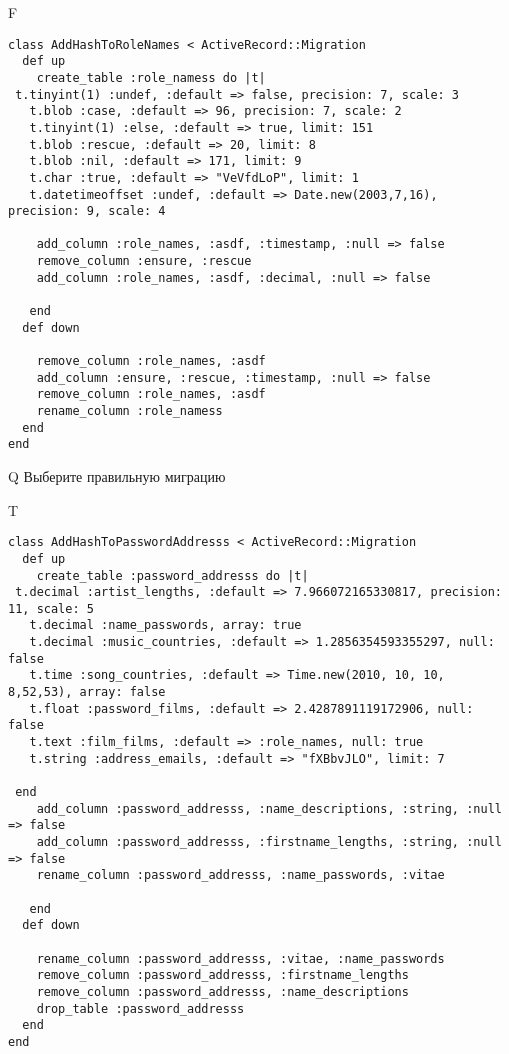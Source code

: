 F
\begin{verbatim}
class AddHashToRoleNames < ActiveRecord::Migration
  def up
    create_table :role_namess do |t| 
 t.tinyint(1) :undef, :default => false, precision: 7, scale: 3
   t.blob :case, :default => 96, precision: 7, scale: 2
   t.tinyint(1) :else, :default => true, limit: 151
   t.blob :rescue, :default => 20, limit: 8
   t.blob :nil, :default => 171, limit: 9
   t.char :true, :default => "VeVfdLoP", limit: 1
   t.datetimeoffset :undef, :default => Date.new(2003,7,16), precision: 9, scale: 4

    add_column :role_names, :asdf, :timestamp, :null => false
    remove_column :ensure, :rescue
    add_column :role_names, :asdf, :decimal, :null => false

   end
  def down

    remove_column :role_names, :asdf
    add_column :ensure, :rescue, :timestamp, :null => false
    remove_column :role_names, :asdf
    rename_column :role_namess
  end
end
\end{verbatim}
Q
Выберите правильную миграцию

T
\begin{verbatim}
class AddHashToPasswordAddresss < ActiveRecord::Migration
  def up
    create_table :password_addresss do |t|
 t.decimal :artist_lengths, :default => 7.966072165330817, precision: 11, scale: 5
   t.decimal :name_passwords, array: true
   t.decimal :music_countries, :default => 1.2856354593355297, null: false
   t.time :song_countries, :default => Time.new(2010, 10, 10, 8,52,53), array: false
   t.float :password_films, :default => 2.4287891119172906, null: false
   t.text :film_films, :default => :role_names, null: true
   t.string :address_emails, :default => "fXBbvJLO", limit: 7

 end
    add_column :password_addresss, :name_descriptions, :string, :null => false
    add_column :password_addresss, :firstname_lengths, :string, :null => false
    rename_column :password_addresss, :name_passwords, :vitae

   end
  def down

    rename_column :password_addresss, :vitae, :name_passwords
    remove_column :password_addresss, :firstname_lengths
    remove_column :password_addresss, :name_descriptions
    drop_table :password_addresss
  end
end
\end{verbatim}

